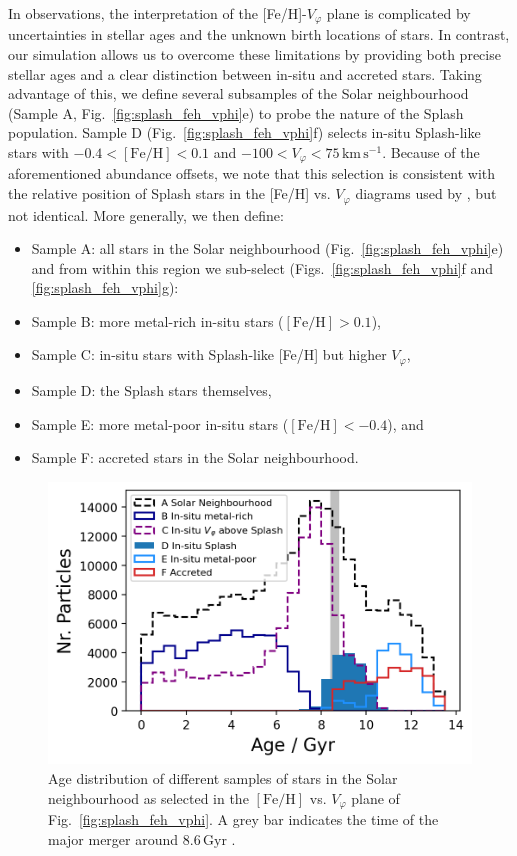 \documentclass[fleqn,usenatbib]{mnras}
\begin{document}
In observations, the interpretation of the [Fe/H]-$V_\varphi$ plane is complicated by uncertainties in stellar ages and the unknown birth locations of stars. In contrast, our simulation allows us to overcome these limitations by providing both precise stellar ages and a clear distinction between in-situ and accreted stars. Taking advantage of this, we define several subsamples of the Solar neighbourhood (Sample A, Fig.~\ref{fig:splash_feh_vphi}e) to probe the nature of the Splash population. Sample D (Fig.~\ref{fig:splash_feh_vphi}f) selects in-situ Splash-like stars with $-0.4 < \mathrm{[Fe/H]} < 0.1$ and $-100 < V_\varphi < 75\,\mathrm{km\,s^{-1}}$. Because of the aforementioned abundance offsets, we note that this selection is consistent with the relative position of Splash stars in the [Fe/H] vs. $V_\varphi$ diagrams used by \citet{Belokurov2020}, but not identical. More generally, we then define:
\begin{itemize}[leftmargin=2em,labelwidth=2em]
    \item Sample A: all stars in the Solar neighbourhood (Fig.~\ref{fig:splash_feh_vphi}e) \\
    and from within this region we sub-select (Figs.~\ref{fig:splash_feh_vphi}f and \ref{fig:splash_feh_vphi}g):
    \item Sample B: more metal-rich in-situ stars ($\mathrm{[Fe/H]} > 0.1$),
    \item Sample C: in-situ stars with Splash-like [Fe/H] but higher $V_\varphi$,
    \item Sample D: the Splash stars themselves,
    \item Sample E: more metal-poor in-situ stars ($\mathrm{[Fe/H]} < -0.4$), and
    \item Sample F: accreted stars in the Solar neighbourhood.
\end{itemize}

\begin{figure}
    \centering
    \includegraphics[width=0.9\columnwidth]{figures/splash_age.png}
    \caption{Age distribution of different samples of stars in the Solar neighbourhood as selected in the $\mathrm{[Fe/H]}$ vs. $V_\varphi$ plane of Fig.~\ref{fig:splash_feh_vphi}. A grey bar indicates the time of the major merger around $8.6\,\mathrm{Gyr}$ \href{https://github.com/svenbuder/golden_thread_II/tree/main/figures}{\faGithub}.}
    \label{fig:splash_age}
\end{figure}
\end{document}
